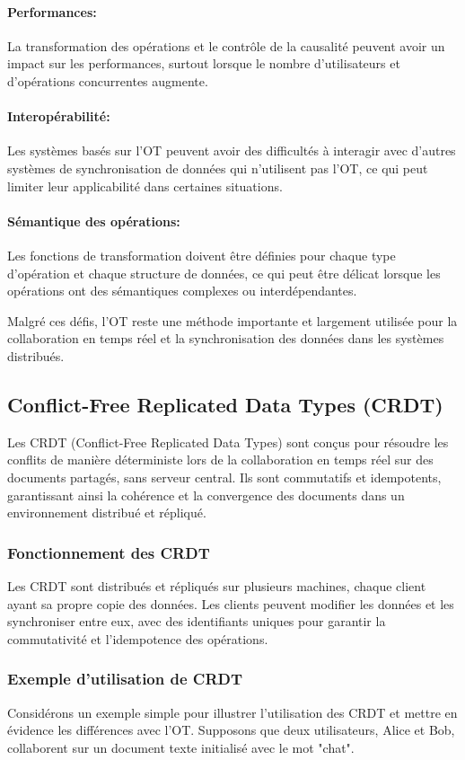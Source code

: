 \paragraph{Performances:} La transformation des opérations et le contrôle de la causalité peuvent avoir un impact sur les performances, surtout lorsque le nombre d'utilisateurs et d'opérations concurrentes augmente.
\paragraph{Interopérabilité:} Les systèmes basés sur l'OT peuvent avoir des difficultés à interagir avec d'autres systèmes de synchronisation de données qui n'utilisent pas l'OT, ce qui peut limiter leur applicabilité dans certaines situations.
\paragraph{Sémantique des opérations:} Les fonctions de transformation doivent être définies pour chaque type d'opération et chaque structure de données, ce qui peut être délicat lorsque les opérations ont des sémantiques complexes ou interdépendantes.

Malgré ces défis, l'OT reste une méthode importante et largement utilisée pour la collaboration en temps réel et la synchronisation des données dans les systèmes distribués.

\subsection{Conflict-Free Replicated Data Types (CRDT)}
Les CRDT (Conflict-Free Replicated Data Types) sont conçus pour résoudre les conflits de manière déterministe lors de la collaboration en temps réel sur des documents partagés, sans serveur central. Ils sont commutatifs et idempotents, garantissant ainsi la cohérence et la convergence des documents dans un environnement distribué et répliqué.

\subsubsection{Fonctionnement des CRDT}
Les CRDT sont distribués et répliqués sur plusieurs machines, chaque client ayant sa propre copie des données. Les clients peuvent modifier les données et les synchroniser entre eux, avec des identifiants uniques pour garantir la commutativité et l'idempotence des opérations.

\subsubsection{Exemple d'utilisation de CRDT}
Considérons un exemple simple pour illustrer l'utilisation des CRDT et mettre en évidence les différences avec l'OT. Supposons que deux utilisateurs, Alice et Bob, collaborent sur un document texte initialisé avec le mot "chat".

